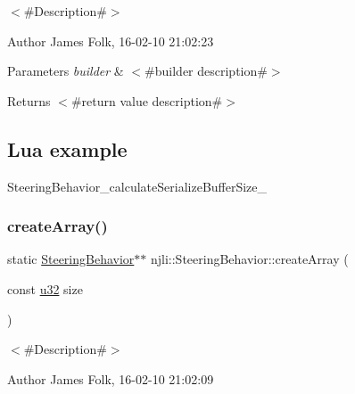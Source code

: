 $<$\#\+Description\#$>$ 

\begin{DoxyAuthor}{Author}
James Folk, 16-\/02-\/10 21\+:02\+:23
\end{DoxyAuthor}

\begin{DoxyParams}{Parameters}
{\em builder} & $<$\#builder description\#$>$\\
\hline
\end{DoxyParams}
\begin{DoxyReturn}{Returns}
$<$\#return value description\#$>$
\end{DoxyReturn}
\hypertarget{classnjli_1_1_steering_behavior_wander_ex1}{}\subsection{Lua example}\label{classnjli_1_1_steering_behavior_wander_ex1}

\begin{DoxyCodeInclude}
\end{DoxyCodeInclude}
Steering\+Behavior\+\_\+calculate\+Serialize\+Buffer\+Size\+\_\+ \mbox{\label{classnjli_1_1_steering_behavior_ac77f8ca5cacd612bc9de8e84c498df8d}} 
\subsubsection{\texorpdfstring{create\+Array()}{createArray()}}
{\footnotesize\ttfamily static \mbox{\hyperlink{classnjli_1_1_steering_behavior}{Steering\+Behavior}}$\ast$$\ast$ njli\+::\+Steering\+Behavior\+::create\+Array (\begin{DoxyParamCaption}\item[{const \mbox{\hyperlink{_util_8h_a10e94b422ef0c20dcdec20d31a1f5049}{u32}}}]{size }\end{DoxyParamCaption})\hspace{0.3cm}{\ttfamily [static]}}



$<$\#\+Description\#$>$ 

\begin{DoxyAuthor}{Author}
James Folk, 16-\/02-\/10 21\+:02\+:09
\end{DoxyAuthor}

